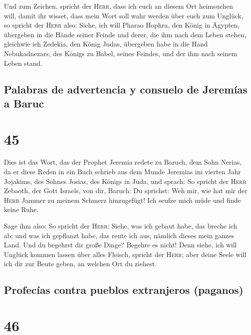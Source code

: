  Und zum Zeichen, spricht der \textsc{Herr}, dass ich
euch an diesem Ort heimsuchen will, damit ihr wisset, dass mein Wort
soll wahr werden über euch zum Unglück,  so spricht der
\textsc{Herr} also: Siehe, ich will Pharao Hophra, den König in Ägypten,
übergeben in die Hände seiner Feinde und derer, die ihm nach dem Leben
stehen, gleichwie ich Zedekia, den König Judas, übergeben habe in die
Hand Nebukadnezars, des Königs zu Babel, seines Feindes, und der ihm
nach seinem Leben stand.

\hypertarget{palabras-de-advertencia-y-consuelo-de-jeremuxedas-a-baruc}{%
\subsection{Palabras de advertencia y consuelo de Jeremías a
Baruc}\label{palabras-de-advertencia-y-consuelo-de-jeremuxedas-a-baruc}}

\hypertarget{section-44}{%
\section{45}\label{section-44}}

 Dies ist das Wort, das der Prophet Jeremia redete zu
Baruch, dem Sohn Nerias, da er diese Reden in ein Buch schrieb aus dem
Munde Jeremias im vierten Jahr Jojakims, des Sohnes Josias, des Königs
in Juda, und sprach:  So spricht der \textsc{Herr}
Zebaoth, der Gott Israels, von dir, Baruch:  Du sprichst:
Weh mir, wie hat mir der \textsc{Herr} Jammer zu meinem Schmerz
hinzugefügt! Ich seufze mich müde und finde keine Ruhe.

 Sage ihm also: So spricht der \textsc{Herr}: Siehe, was
ich gebaut habe, das breche ich ab; und was ich gepflanzt habe, das
reute ich aus, nämlich dieses mein ganzes Land.  Und du
begehrst dir große Dinge? Begehre es nicht! Denn siehe, ich will Unglück
kommen lassen über alles Fleisch, spricht der \textsc{Herr}; aber deine
Seele will ich dir zur Beute geben, an welchen Ort du ziehest.

\hypertarget{profecuxedas-contra-pueblos-extranjeros-paganos}{%
\subsection{Profecías contra pueblos extranjeros
(paganos)}\label{profecuxedas-contra-pueblos-extranjeros-paganos}}

\hypertarget{section-45}{%
\section{46}\label{section-45}}

